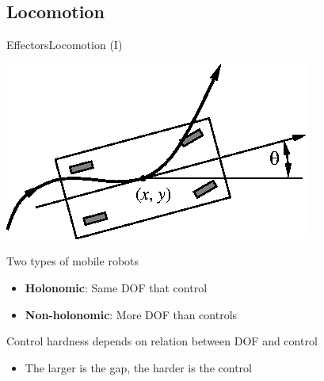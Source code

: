 \documentclass[10pt,compress]{beamer} %
\begin{document}
\subsection{Locomotion}
\begin{frame}{Effectors}{Locomotion (I)}
	\begin{center}
	\includegraphics[width=0.4\linewidth]{figs/car-like.eps}
	\end{center}
	Two types of mobile robots
	\begin{itemize}
		\item \textbf{Holonomic}: Same DOF that control
		\item \textbf{Non-holonomic}: More DOF than controls
	\end{itemize}
	Control hardness depends on relation between DOF and control
	\begin{itemize}
		\item The larger is the gap, the harder is the control
	\end{itemize}
\end{frame}
\end{document}
